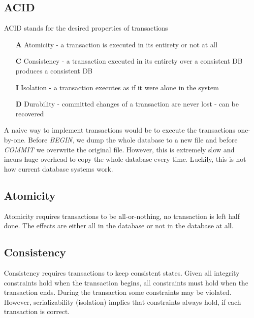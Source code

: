 \subsection{ACID}
ACID stands for the desired properties of transactions
\begin{enumerate}
\item[\textbf{A}] Atomicity - a transaction is executed in its entirety or not at all
\item[\textbf{C}] Consistency - a transaction executed in its entirety over a consistent DB produces a consistent DB
\item[\textbf{I}] Isolation - a transaction executes as if it were alone in the system
\item[\textbf{D}] Durability - committed changes of a transaction are never lost - can be recovered
\end{enumerate}
A naive way to implement transactions would be to execute the transactions one-by-one. Before \textit{BEGIN}, we dump the whole database to a new file and before \textit{COMMIT} we overwrite the original file. However, this is extremely slow and incurs huge overhead to copy the whole database every time. Luckily, this is not how current database systems work.


\subsection{Atomicity}
Atomicity requires transactions to be all-or-nothing, no transaction is left half done. The effects are either all in the database or not in the database at all. 
\subsection{Consistency}
Consistency requires transactions to keep consistent states. Given all integrity constraints hold when the transaction begins, all constraints must hold when the transaction ends. During the transaction some constraints may be violated. However, serializability (isolation) implies that constraints always hold, if each transaction is correct.
